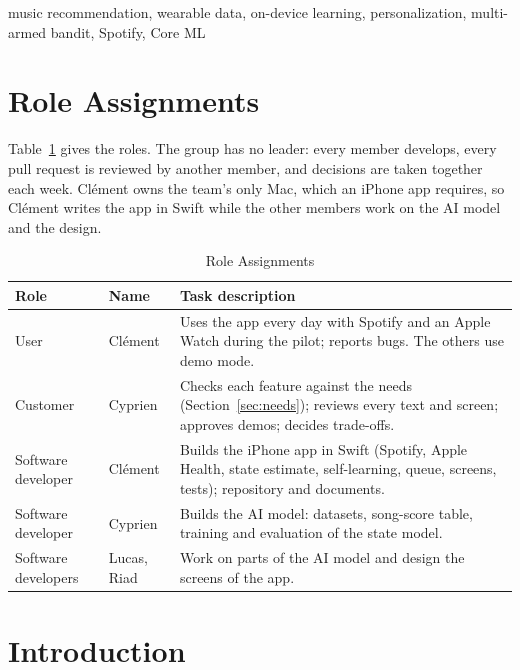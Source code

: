 \documentclass[conference]{IEEEtran}
\begin{document}
\begin{IEEEkeywords}
music recommendation, wearable data, on-device learning, personalization, multi-armed bandit, Spotify, Core ML
\end{IEEEkeywords}

\section*{Role Assignments}
Table~\ref{tab:roles} gives the roles. The group has no leader: every member develops, every pull request is reviewed by another member, and decisions are taken together each week. Clément owns the team's only Mac, which an iPhone app requires, so Clément writes the app in Swift while the other members work on the AI model and the design.
\begin{table}[!ht]
\centering
\caption{Role Assignments}
\label{tab:roles}
\footnotesize
\begin{tabularx}{\columnwidth}{|>{\raggedright\arraybackslash}p{1.45cm}|>{\raggedright\arraybackslash}p{1.55cm}|X|}
\hline
\textbf{Role} & \textbf{Name} & \textbf{Task description} \\ \hline
User & Clément & Uses the app every day with Spotify and an Apple Watch during the pilot; reports bugs. The others use demo mode. \\ \hline
Customer & Cyprien & Checks each feature against the needs (Section~\ref{sec:needs}); reviews every text and screen; approves demos; decides trade-offs. \\ \hline
Software developer & Clément & Builds the iPhone app in Swift (Spotify, Apple Health, state estimate, self-learning, queue, screens, tests); repository and documents. \\ \hline
Software developer & Cyprien & Builds the AI model: datasets, song-score table, training and evaluation of the state model. \\ \hline
Software developers & Lucas, Riad & Work on parts of the AI model and design the screens of the app. \\ \hline
\end{tabularx}
\end{table}

\section{Introduction}
\end{document}
